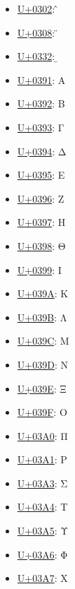 \begin{itemize}
	\item \href{https://www.compart.com/en/unicode/U+0302}{U+0302}: ̂
	\item \href{https://www.compart.com/en/unicode/U+0308}{U+0308}: ̈
	\item \href{https://www.compart.com/en/unicode/U+0332}{U+0332}: ̲
	\item \href{https://www.compart.com/en/unicode/U+0391}{U+0391}: Α
	\item \href{https://www.compart.com/en/unicode/U+0392}{U+0392}: Β
	\item \href{https://www.compart.com/en/unicode/U+0393}{U+0393}: Γ
	\item \href{https://www.compart.com/en/unicode/U+0394}{U+0394}: Δ
	\item \href{https://www.compart.com/en/unicode/U+0395}{U+0395}: Ε
	\item \href{https://www.compart.com/en/unicode/U+0396}{U+0396}: Ζ
	\item \href{https://www.compart.com/en/unicode/U+0397}{U+0397}: Η
	\item \href{https://www.compart.com/en/unicode/U+0398}{U+0398}: Θ
	\item \href{https://www.compart.com/en/unicode/U+0399}{U+0399}: Ι
	\item \href{https://www.compart.com/en/unicode/U+039A}{U+039A}: Κ
	\item \href{https://www.compart.com/en/unicode/U+039B}{U+039B}: Λ
	\item \href{https://www.compart.com/en/unicode/U+039C}{U+039C}: Μ
	\item \href{https://www.compart.com/en/unicode/U+039D}{U+039D}: Ν
	\item \href{https://www.compart.com/en/unicode/U+039E}{U+039E}: Ξ
	\item \href{https://www.compart.com/en/unicode/U+039F}{U+039F}: Ο
	\item \href{https://www.compart.com/en/unicode/U+03A0}{U+03A0}: Π
	\item \href{https://www.compart.com/en/unicode/U+03A1}{U+03A1}: Ρ
	\item \href{https://www.compart.com/en/unicode/U+03A3}{U+03A3}: Σ
	\item \href{https://www.compart.com/en/unicode/U+03A4}{U+03A4}: Τ
	\item \href{https://www.compart.com/en/unicode/U+03A5}{U+03A5}: Υ
	\item \href{https://www.compart.com/en/unicode/U+03A6}{U+03A6}: Φ
	\item \href{https://www.compart.com/en/unicode/U+03A7}{U+03A7}: Χ

\end{itemize}

